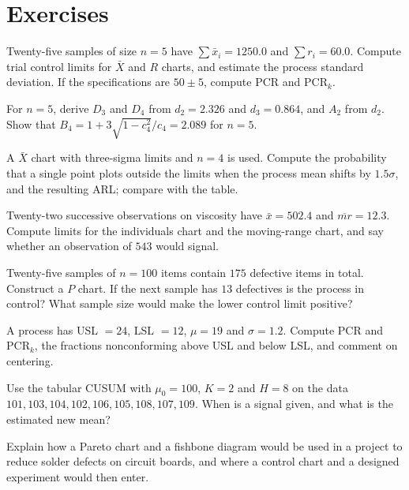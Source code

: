 \section{Exercises}

\begin{exercise}
Twenty-five samples of size $n=5$ have $\sum\bar{x}_i=1250.0$ and $\sum r_i=60.0$. Compute trial control limits for $\bar{X}$ and $R$ charts, and estimate the process standard deviation. If the specifications are $50\pm5$, compute PCR and PCR$_k$.
\end{exercise}

\begin{exercise}
For $n=5$, derive $D_3$ and $D_4$ from $d_2=2.326$ and $d_3=0.864$, and $A_2$ from $d_2$. Show that $B_4=1+3\sqrt{1-c_4^2}/c_4=2.089$ for $n=5$.
\end{exercise}

\begin{exercise}
A $\bar{X}$ chart with three-sigma limits and $n=4$ is used. Compute the probability that a single point plots outside the limits when the process mean shifts by $1.5\sigma$, and the resulting ARL; compare with the table.
\end{exercise}

\begin{exercise}
Twenty-two successive observations on viscosity have $\bar{x}=502.4$ and $\overline{mr}=12.3$. Compute limits for the individuals chart and the moving-range chart, and say whether an observation of $543$ would signal.
\end{exercise}

\begin{exercise}
Twenty-five samples of $n=100$ items contain $175$ defective items in total. Construct a $P$ chart. If the next sample has $13$ defectives is the process in control? What sample size would make the lower control limit positive?
\end{exercise}

\begin{exercise}
A process has USL $=24$, LSL $=12$, $\mu=19$ and $\sigma=1.2$. Compute PCR and PCR$_k$, the fractions nonconforming above USL and below LSL, and comment on centering.
\end{exercise}

\begin{exercise}
Use the tabular CUSUM with $\mu_0=100$, $K=2$ and $H=8$ on the data $101,103,104,102,106,105,108,107,109$. When is a signal given, and what is the estimated new mean?
\end{exercise}

\begin{exercise}
Explain how a Pareto chart and a fishbone diagram would be used in a project to reduce solder defects on circuit boards, and where a control chart and a designed experiment would then enter.
\end{exercise}
